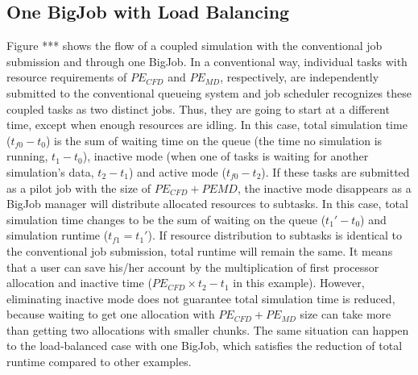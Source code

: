 \documentclass[conference,final]{IEEEtran}
\begin{document}
\subsection{One BigJob with Load Balancing}
Figure *** shows the flow of a coupled simulation with the conventional job submission and through one BigJob. In a conventional way, individual tasks with resource requirements of $PE_{CFD}$ and $PE_{MD}$, respectively, are independently submitted to the conventional queueing system and job scheduler recognizes these coupled tasks as two distinct jobs. Thus, they are going to start at a different time, except when enough resources are idling. In this case, total simulation time ($t_{f0}-t_{0}$) is the sum of waiting time on the queue (the time no simulation is running, $t_1-t_0$), inactive mode (when one of tasks is waiting for another simulation's data, $t_2-t_1$) and active mode ($t_{f0}-t_2$).
If these tasks are submitted as a pilot job with the size of $PE_{CFD}+PE{MD}$, the inactive mode disappears as a BigJob manager will distribute allocated resources to subtasks. In this case, total simulation time changes to be the sum of waiting on the queue ($t_{1}'-t_{0}$) and simulation runtime ($t_{f1}=t_{1}'$). If resource distribution to subtasks is identical to the conventional job submission, total runtime will remain the same. It means that a user can save his/her account by the multiplication of first processor allocation and inactive time ($PE_{CFD} \times t_2-t_1$ in this example). However, eliminating inactive mode does not guarantee total simulation time is reduced, because waiting to get one allocation with $PE_{CFD}+PE_{MD}$ size can take more than getting two allocations with smaller chunks. The same situation can happen to the load-balanced case with one BigJob, which satisfies the reduction of total runtime compared to other examples.
\end{document}
